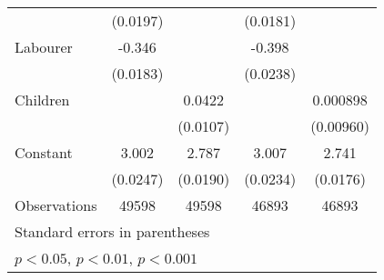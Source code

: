 {\begin{tabular}{l*{4}{c}}
                    &    (0.0197)         &                     &    (0.0181)         &                     \\
[1em]
Labourer            &      -0.346\sym{***}&                     &      -0.398\sym{***}&                     \\
                    &    (0.0183)         &                     &    (0.0238)         &                     \\
[1em]
Children            &                     &      0.0422\sym{***}&                     &    0.000898         \\
                    &                     &    (0.0107)         &                     &   (0.00960)         \\
[1em]
Constant            &       3.002\sym{***}&       2.787\sym{***}&       3.007\sym{***}&       2.741\sym{***}\\
                    &    (0.0247)         &    (0.0190)         &    (0.0234)         &    (0.0176)         \\
\hline
Observations        &       49598         &       49598         &       46893         &       46893         \\
\hline\hline
\multicolumn{5}{l}{\footnotesize Standard errors in parentheses}\\
\multicolumn{5}{l}{\footnotesize \sym{*} \(p<0.05\), \sym{**} \(p<0.01\), \sym{***} \(p<0.001\)}\\
\end{tabular}
}
